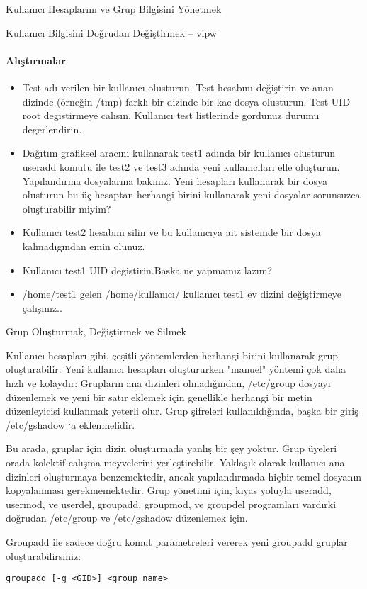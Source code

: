 \begin{section}{Kullanıcı Hesaplarını ve Grup Bilgisini Yönetmek}
\begin{subsection}{Kullanıcı Bilgisini Doğrudan Değiştirmek -- vipw}
\paragraph{Alıştırmalar}{
\begin{itemize}
\item Test adı verilen bir kullanıcı olusturun. Test hesabını değiştirin ve anan dizinde (örneğin /tmp) farklı bir dizinde bir kac dosya olusturun. Test UID root degistirmeye calısın. Kullanıcı test listlerinde gordunuz durumu degerlendirin.
\item Dağıtım grafiksel aracını kullanarak test1 adında bir kullanıcı olusturun useradd komutu ile test2 ve test3 adında yeni kullanıcıları elle oluşturun. Yapılandırma dosyalarına bakınız. Yeni hesapları kullanarak bir dosya olusturun bu üç hesaptan herhangi birini kullanarak yeni dosyalar sorunsuzca oluşturabilir miyim?
\item Kullanıcı test2 hesabını silin ve bu kullanıcıya ait sistemde bir dosya kalmadıgından emin olunuz.
\item Kullanıcı test1 UID degistirin.Baska ne yapmamız lazım?
\item /home/test1 gelen /home/kullanıcı/ kullanıcı test1 ev dizini değiştirmeye çalışınız..
\end{itemize}}
\end{subsection}
\begin{subsection}{Grup Oluşturmak, Değiştirmek ve Silmek}

Kullanıcı hesapları gibi, çeşitli yöntemlerden herhangi birini kullanarak grup oluşturabilir. Yeni kullanıcı hesapları oluştururken "manuel" yöntemi çok daha hızlı ve kolaydır: Grupların ana dizinleri olmadığından, /etc/group dosyayı düzenlemek ve yeni bir satır eklemek için genellikle herhangi bir metin düzenleyicisi kullanmak yeterli olur. Grup şifreleri kullanıldığında, başka bir giriş /etc/gshadow ‘a eklenmelidir.

Bu arada, gruplar için dizin oluşturmada yanlış bir şey yoktur. Grup üyeleri orada kolektif calışma meyvelerini yerleştirebilir. Yaklaşık olarak kullanıcı ana dizinleri oluşturmaya benzemektedir, ancak yapılandırmada hiçbir temel dosyanın kopyalanması gerekmemektedir. Grup yönetimi için, kıyas yoluyla useradd, usermod, ve userdel, groupadd, groupmod, ve groupdel programları vardırki doğrudan /etc/group ve /etc/gshadow düzenlemek için.

Groupadd ile sadece doğru komut parametreleri vererek yeni groupadd gruplar oluşturabilirsiniz:
\begin{verbatim}
groupadd [-g <GID>] <group name>
\end{verbatim}


\end{subsection}
\end{section}
